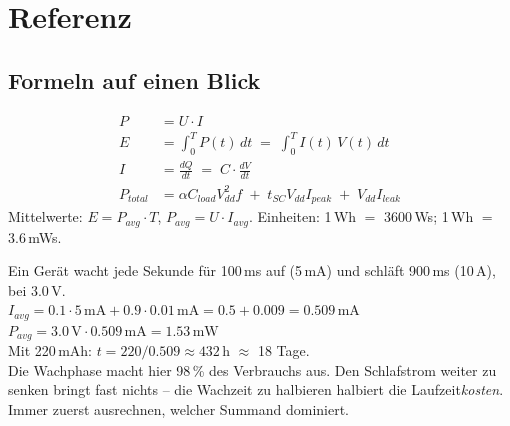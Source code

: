 \section{Referenz}
\label{sec:ref}

\subsection{Formeln auf einen Blick}
\begin{formel}
\begin{align*}
P &= U \cdot I \\
E &= \int_0^T P(t)\,dt \;=\; \int_0^T I(t)\,V(t)\,dt \\
I &= \frac{dQ}{dt} \;=\; C \cdot \frac{dV}{dt} \\
P_{total} &= \alpha C_{load} V_{dd}^{2} f \;+\; t_{SC} V_{dd} I_{peak}
   \;+\; V_{dd} I_{leak}
\end{align*}
Mittelwerte: $E = P_{avg} \cdot T$, $P_{avg} = U \cdot I_{avg}$.
Einheiten: 1\,Wh $=$ 3600\,Ws; 1\,\textmu Wh $=$ 3.6\,mWs.
\end{formel}

\begin{bsp}
Ein Gerät wacht jede Sekunde für 100\,ms auf (5\,mA) und schläft 900\,ms
(10\,\textmu A), bei 3.0\,V.\\
$I_{avg} = 0.1\cdot 5\,\text{mA} + 0.9\cdot 0.01\,\text{mA}
 = 0.5 + 0.009 = 0.509\,\text{mA}$\\
$P_{avg} = 3.0\,\text{V} \cdot 0.509\,\text{mA} = 1.53\,\text{mW}$\\
Mit 220\,mAh: $t = 220/0.509 \approx 432\,$h $\approx$ 18 Tage.\\[2pt]
\merkzeile Die Wachphase macht hier 98\,\% des Verbrauchs aus. Den
Schlafstrom weiter zu senken bringt fast nichts -- die Wachzeit zu
halbieren halbiert die Laufzeit\emph{kosten}. Immer zuerst ausrechnen,
welcher Summand dominiert.
\end{bsp}

